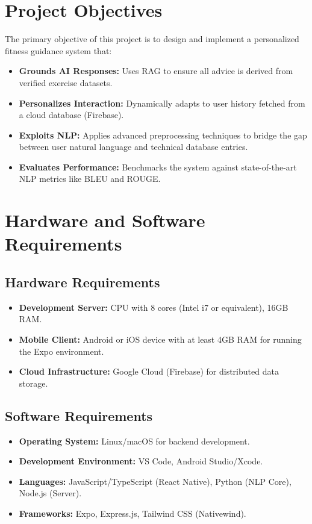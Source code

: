 \documentclass[12pt,a4paper]{report}
\begin{document}
\section{Project Objectives}
The primary objective of this project is to design and implement a personalized fitness guidance system that:
\begin{itemize}
    \item \textbf{Grounds AI Responses:} Uses RAG to ensure all advice is derived from verified exercise datasets.
    \item \textbf{Personalizes Interaction:} Dynamically adapts to user history fetched from a cloud database (Firebase).
    \item \textbf{Exploits NLP:} Applies advanced preprocessing techniques to bridge the gap between user natural language and technical database entries.
    \item \textbf{Evaluates Performance:} Benchmarks the system against state-of-the-art NLP metrics like BLEU and ROUGE.
\end{itemize}

\section{Hardware and Software Requirements}
\subsection{Hardware Requirements}
\begin{itemize}
    \item \textbf{Development Server:} CPU with 8 cores (Intel i7 or equivalent), 16GB RAM.
    \item \textbf{Mobile Client:} Android or iOS device with at least 4GB RAM for running the Expo environment.
    \item \textbf{Cloud Infrastructure:} Google Cloud (Firebase) for distributed data storage.
\end{itemize}

\subsection{Software Requirements}
\begin{itemize}
    \item \textbf{Operating System:} Linux/macOS for backend development.
    \item \textbf{Development Environment:} VS Code, Android Studio/Xcode.
    \item \textbf{Languages:} JavaScript/TypeScript (React Native), Python (NLP Core), Node.js (Server).
    \item \textbf{Frameworks:} Expo, Express.js, Tailwind CSS (Nativewind).
\end{itemize}
\end{document}
